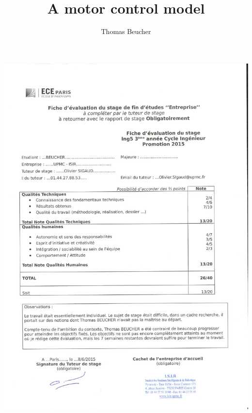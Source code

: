 \documentclass[pdftex,a4paper,12pt]{report}
\begin{document}
\title{A motor control model}
\author{Thomas Beucher}
\maketitle

\begin{center}
\includegraphics[scale=0.7]{images/eval_Beucher.pdf}
\end{center}
\end{document}
